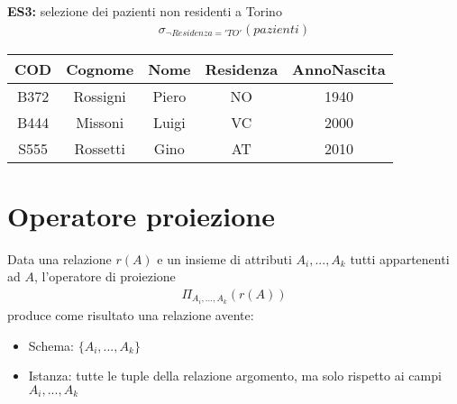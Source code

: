\textbf{ES3:} selezione dei pazienti non residenti a Torino
    \begin{equation}\begin{aligned}
        \sigma_{\neg Residenza = 'TO'}(pazienti)
    \end{aligned}\end{equation}
    \begin{center}\begin{tabular}{|c|c|c|c|c|} \hline
        \textbf{COD} & \textbf{Cognome} & \textbf{Nome} 
        & \textbf{Residenza} & \textbf{AnnoNascita}\\ \hline
        B372 & Rossigni & Piero & NO & 1940\\ \hline
        B444 & Missoni & Luigi & VC & 2000\\ \hline
        S555 & Rossetti & Gino & AT & 2010\\ \hline
     \end{tabular}\end{center}
     
\section{Operatore proiezione}
Data una relazione $r(A)$ e un insieme di attributi $A_i, ..., A_k$ tutti appartenenti ad $A$, l'operatore di proiezione
    \begin{equation}\begin{aligned}
        \Pi_{A_i, ..., A_k}(r(A))
    \end{aligned}\end{equation}
produce come risultato una relazione avente:
    \begin{itemize}
        \item{Schema: $\{   A_i, ..., A_k   \}$}
        \item{Istanza: tutte le tuple della relazione argomento, ma solo rispetto ai campi $A_i, ..., A_k$}
    \end{itemize}

